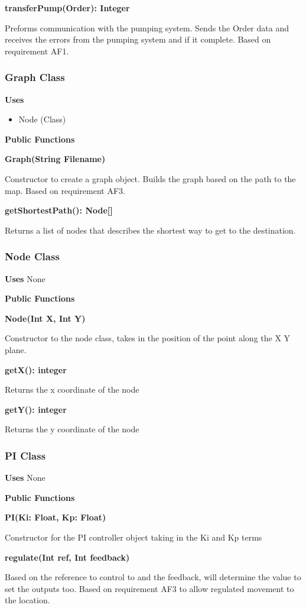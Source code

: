 \documentclass [10pt]{article}
\begin{document}
\textbf{transferPump(Order): Integer}

Preforms communication with the pumping system. Sends the Order data and receives the errors from the pumping system and if it complete. Based on requirement AF1.

\subsubsection{Graph Class}
\textbf{Uses}
\begin{itemize}
	\item Node (Class)
\end{itemize}

\textbf{Public Functions}

\textbf{Graph(String Filename)}

Constructor to create a graph object. Builds the graph based on the path to the map. Based on requirement AF3.

\textbf{getShortestPath(): Node[]}

Returns a list of nodes that describes the shortest way to get to the destination. 


\subsubsection{Node Class}
\textbf{Uses}
None 

\textbf{Public Functions}

\textbf{Node(Int X, Int Y)}

Constructor to the node class, takes in the position of the point along the X Y plane.

\textbf{getX(): integer}


Returns the x coordinate of the node

\textbf{getY(): integer}

Returns the y coordinate of the node

\subsubsection{PI Class}
\textbf{Uses}
None 

\textbf{Public Functions}

\textbf{PI(Ki: Float, Kp: Float)}

Constructor for the PI controller object taking in the Ki and Kp terms

\textbf{regulate(Int ref, Int feedback)}

Based on the reference to control to and the feedback, will determine the value to set the outputs too.  Based on requirement AF3 to allow regulated movement to the location.
\end{document}
